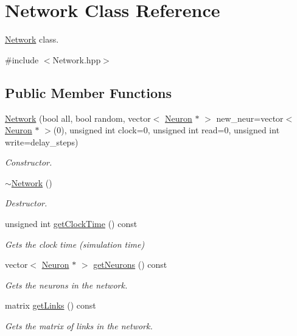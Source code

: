 \hypertarget{classNetwork}{\section{Network Class Reference}
\label{classNetwork}
}


\hyperlink{classNetwork}{Network} class.  




{\ttfamily \#include $<$Network.\-hpp$>$}

\subsection*{Public Member Functions}
\begin{DoxyCompactItemize}
\item 
\hyperlink{classNetwork_a91e7956657baf526ceeff2896889c811}{Network} (bool all, bool random, vector$<$ \hyperlink{classNeuron}{Neuron} $\ast$ $>$ new\-\_\-neur=vector$<$ \hyperlink{classNeuron}{Neuron} $\ast$ $>$(0), unsigned int clock=0, unsigned int read=0, unsigned int write=delay\-\_\-steps)
\begin{DoxyCompactList}\small\item\em Constructor. \end{DoxyCompactList}\item 
\hyperlink{classNetwork_a7a4e19cdb4bf0c7ecf82baa643831492}{$\sim$\-Network} ()
\begin{DoxyCompactList}\small\item\em Destructor. \end{DoxyCompactList}\item 
unsigned int \hyperlink{classNetwork_a0d38219c6a64a9532b05d61d05b85a11}{get\-Clock\-Time} () const 
\begin{DoxyCompactList}\small\item\em Gets the clock time (simulation time) \end{DoxyCompactList}\item 
vector$<$ \hyperlink{classNeuron}{Neuron} $\ast$ $>$ \hyperlink{classNetwork_a8032b42ba5c9c445dcc0dd0a4916f633}{get\-Neurons} () const 
\begin{DoxyCompactList}\small\item\em Gets the neurons in the network. \end{DoxyCompactList}\item 
matrix \hyperlink{classNetwork_a619c7fc6bfe06db4b449c96051f9c409}{get\-Links} () const 
\begin{DoxyCompactList}\small\item\em Gets the matrix of links in the network. \end{DoxyCompactList}\item 

\end{DoxyCompactItemize}
